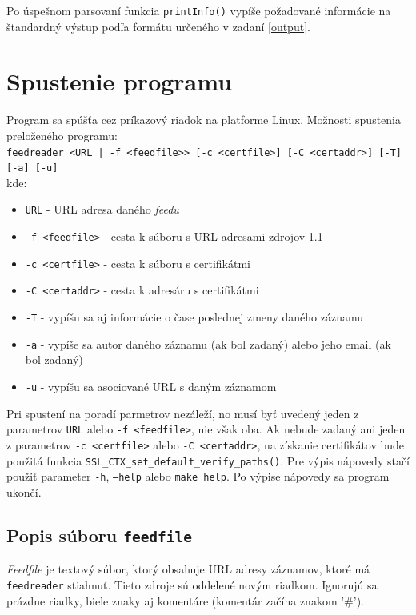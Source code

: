 \documentclass[a4paper, 11pt]{article}
\begin{document}
    Po úspešnom parsovaní funkcia \texttt{printInfo()} vypíše požadované informácie na štandardný výstup podľa formátu určeného v zadaní \ref{output}. 

    \section{Spustenie programu}
    \label{start}
    Program sa spúšťa cez príkazový riadok na platforme Linux. Možnosti spustenia preloženého programu: \\
    \texttt{feedreader <URL | -f <feedfile>> [-c <certfile>] [-C <certaddr>] [-T] [-a] [-u]} \\
    kde: \\
    \begin{itemize}
        \item \texttt{URL} - URL adresa daného \textit{feedu}
        \item \texttt{-f <feedfile>} - cesta k súboru s URL adresami zdrojov \ref{feedfile}
        \item \texttt{-c <certfile>} - cesta k súboru s certifikátmi
        \item \texttt{-C <certaddr>} - cesta k adresáru s certifikátmi
        \item \texttt{-T} - vypíšu sa aj informácie o čase poslednej zmeny daného záznamu
        \item \texttt{-a} - vypíše sa autor daného záznamu (ak bol zadaný) alebo jeho email (ak bol zadaný)
        \item \texttt{-u} - vypíšu sa asociované URL s daným záznamom
    \end{itemize}
    Pri spustení na poradí parmetrov nezáleží, no musí byť uvedený jeden z parametrov \texttt{URL} alebo \texttt{-f <feedfile>}, nie však oba. Ak nebude zadaný ani jeden z parametrov \texttt{-c <certfile>} alebo \texttt{-C <certaddr>}, na získanie certifikátov bude použitá funkcia \texttt{SSL\_CTX\_set\_default\_verify\_paths()}. Pre výpis nápovedy stačí použiť parameter \texttt{-h}, \texttt{--help} alebo \texttt{make help}. Po výpise nápovedy sa program ukončí.
    
    \subsection{Popis súboru \texttt{feedfile}}
    \label{feedfile}
    \textit{Feedfile} je textový súbor, ktorý obsahuje URL adresy záznamov, ktoré má \texttt{feedreader} stiahnuť. Tieto zdroje sú oddelené novým riadkom. Ignorujú sa prázdne riadky, biele znaky aj komentáre (komentár začína znakom '\#'). \\
\end{document}
